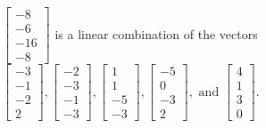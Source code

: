 \begin{exercise}
\begin{exerciseStatement}
  \end{exerciseStatement}
  \begin{exerciseAnswer}
   \(\left[\begin{array}{c}
-8 \\
-6 \\
-16 \\
-8
\end{array}\right]\) 
  	 is  
	a linear combination of the vectors \(\left[\begin{array}{c}
-3 \\
-1 \\
-2 \\
2
\end{array}\right] , \left[\begin{array}{c}
-2 \\
-3 \\
-1 \\
-3
\end{array}\right] , \left[\begin{array}{c}
1 \\
1 \\
-5 \\
-3
\end{array}\right] , \left[\begin{array}{c}
-5 \\
0 \\
-3 \\
2
\end{array}\right] , \text{ and } \left[\begin{array}{c}
4 \\
1 \\
3 \\
0
\end{array}\right]\).

	
  


  \end{exerciseAnswer}
\end{exercise}
